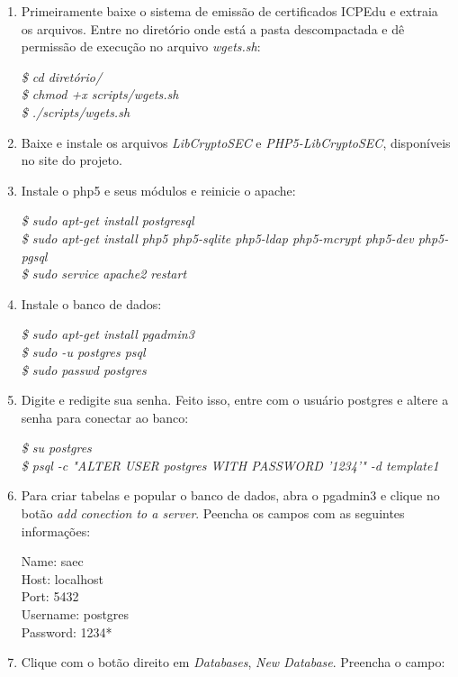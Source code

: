 \begin{enumerate}
  \item Primeiramente baixe o sistema de emissão de certificados ICPEdu e extraia os arquivos. Entre no diretório onde está a pasta descompactada e dê permissão de execução no arquivo \textit{wgets.sh}:  
  
    \textit{\$ cd diretório/} \\
    \textit{\$ chmod +x scripts/wgets.sh} \\
    \textit{\$ ./scripts/wgets.sh}
    
  \item Baixe e instale os arquivos \textit{ LibCryptoSEC} e \textit{PHP5-LibCryptoSEC}, disponíveis no site do projeto.
  
  \item Instale o php5 e seus módulos e reinicie o apache:  
  
    \textit{\$ sudo apt-get install postgresql} \\
    \textit{\$ sudo apt-get install php5 php5-sqlite php5-ldap php5-mcrypt php5-dev php5-pgsql} \\
    \textit{\$ sudo service apache2 restart}
  
  \item Instale o banco de dados:  
  
    \textit{\$ sudo apt-get install pgadmin3} \\
    \textit{\$ sudo -u postgres psql} \\
    \textit{\$ sudo passwd postgres}
  
  \item Digite e redigite sua senha. Feito isso, entre com o usuário postgres e altere a senha para conectar ao banco:  
  
    \textit{\$ su postgres}\\
    \textit{\$ psql -c "ALTER USER postgres WITH PASSWORD '1234'" -d template1}
    
  \item Para criar tabelas e popular o banco de dados, abra o pgadmin3 e clique no botão \textit{add conection to a server}. Peencha os campos com as seguintes informações: 
  
  Name: saec\\
  Host: localhost\\
  Port: 5432\\
  Username: postgres\\
  Password: 1234*
  
  \item Clique com o botão direito em \textit{Databases}, \textit{New Database}. Preencha o campo:
  

\end{enumerate}
